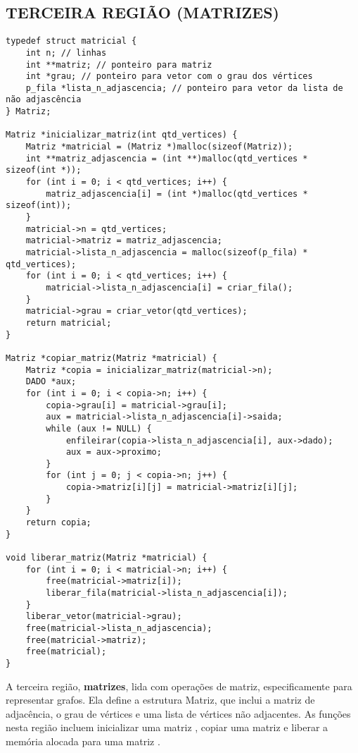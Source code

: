 \documentclass[12pt, openright, oneside, a4paper, chapter=TITLE, section=TITLE, subsection=TITLE, subsubsection=TITLE, brazil]{abntex2}
\newenvironment{codebox}%
  {\begin{mdframed}[backgroundcolor=gray!5, linecolor=gray, roundcorner=5pt]}%
  {\end{mdframed}}
\begin{document}
\subsection{TERCEIRA REGIÃO (MATRIZES)}
\begin{codebox}
\begin{verbatim}
typedef struct matricial {
    int n; // linhas
    int **matriz; // ponteiro para matriz
    int *grau; // ponteiro para vetor com o grau dos vértices
    p_fila *lista_n_adjascencia; // ponteiro para vetor da lista de não adjascência
} Matriz;

Matriz *inicializar_matriz(int qtd_vertices) {
    Matriz *matricial = (Matriz *)malloc(sizeof(Matriz));
    int **matriz_adjascencia = (int **)malloc(qtd_vertices * sizeof(int *));
    for (int i = 0; i < qtd_vertices; i++) {
        matriz_adjascencia[i] = (int *)malloc(qtd_vertices * sizeof(int));
    }
    matricial->n = qtd_vertices;
    matricial->matriz = matriz_adjascencia;
    matricial->lista_n_adjascencia = malloc(sizeof(p_fila) * qtd_vertices);
    for (int i = 0; i < qtd_vertices; i++) {
        matricial->lista_n_adjascencia[i] = criar_fila();
    }
    matricial->grau = criar_vetor(qtd_vertices);
    return matricial;
}

Matriz *copiar_matriz(Matriz *matricial) {
    Matriz *copia = inicializar_matriz(matricial->n);
    DADO *aux;
    for (int i = 0; i < copia->n; i++) {
        copia->grau[i] = matricial->grau[i];
        aux = matricial->lista_n_adjascencia[i]->saida;
        while (aux != NULL) {
            enfileirar(copia->lista_n_adjascencia[i], aux->dado);
            aux = aux->proximo;
        }
        for (int j = 0; j < copia->n; j++) {
            copia->matriz[i][j] = matricial->matriz[i][j];
        }
    }
    return copia;
}

void liberar_matriz(Matriz *matricial) {
    for (int i = 0; i < matricial->n; i++) {
        free(matricial->matriz[i]);
        liberar_fila(matricial->lista_n_adjascencia[i]);
    }
    liberar_vetor(matricial->grau);
    free(matricial->lista_n_adjascencia);
    free(matricial->matriz);
    free(matricial);
}
\end{verbatim}
\end{codebox}
A terceira região, \textbf{matrizes}, lida com operações de matriz, especificamente para representar grafos. Ela define a estrutura Matriz, que inclui a matriz de adjacência, o grau de vértices e uma lista de vértices não adjacentes. As funções nesta região incluem inicializar uma matriz , copiar uma matriz  e liberar a memória alocada para uma matriz .
\end{document}
